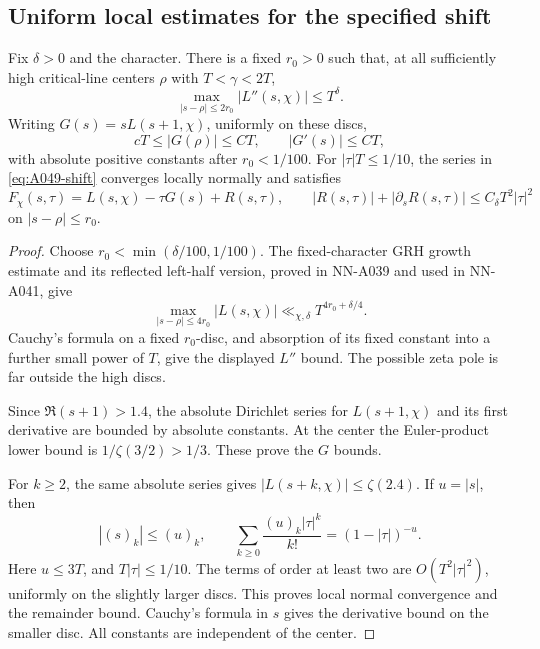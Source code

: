 \subsection*{Uniform local estimates for the specified shift}

\begin{lemma}\label{lem:A049-local}
Fix \(\delta>0\) and the character. There is a fixed
\(r_0>0\) such that, at all sufficiently high critical-line
centers \(\rho\) with \(T<\gamma<2T\),
\[
 \max_{|s-\rho|\le2r_0}|L''(s,\chi)|\le T^\delta.
\]
Writing \(G(s)=sL(s+1,\chi)\), uniformly on these discs,
\[
 cT\le |G(\rho)|\le CT,\qquad |G'(s)|\le CT,
\]
with absolute positive constants after \(r_0<1/100\).
For \(|\tau|T\le1/10\), the series in
\eqref{eq:A049-shift} converges locally normally and satisfies
\begin{equation}\label{eq:A049-local-expansion}
 F_\chi(s,\tau)=L(s,\chi)-\tau G(s)+R(s,\tau),\qquad
 |R(s,\tau)|+|\partial_sR(s,\tau)|\le C_\delta T^2|\tau|^2
\end{equation}
on \(|s-\rho|\le r_0\).
\end{lemma}

\begin{proof}
Choose \(r_0<\min(\delta/100,1/100)\). The fixed-character
GRH growth estimate and its reflected left-half version,
proved in NN-A039 and used in NN-A041, give
\[
 \max_{|s-\rho|\le4r_0}|L(s,\chi)|
       \ll_{\chi,\delta}T^{4r_0+\delta/4}.
\]
Cauchy's formula on a fixed \(r_0\)-disc, and absorption
of its fixed constant into a further small power of \(T\),
give the displayed \(L''\) bound. The possible zeta pole
is far outside the high discs.

Since \(\Re(s+1)>1.4\), the absolute Dirichlet series for
\(L(s+1,\chi)\) and its first derivative are bounded by
absolute constants. At the center the Euler-product lower
bound is \(1/\zeta(3/2)>1/3\). These prove the \(G\) bounds.

For \(k\ge2\), the same absolute series gives
\(|L(s+k,\chi)|\le\zeta(2.4)\). If \(u=|s|\), then
\[
 |(s)_k|\le(u)_k,\qquad
 \sum_{k\ge0}\frac{(u)_k|\tau|^k}{k!}
                         =(1-|\tau|)^{-u}.
\]
Here \(u\le3T\), and \(T|\tau|\le1/10\).
The terms of order at least two are \(O(T^2|\tau|^2)\),
uniformly on the slightly larger discs. This proves local
normal convergence and the remainder bound. Cauchy's
formula in \(s\) gives the derivative bound on the smaller
disc. All constants are independent of the center.
\end{proof}

